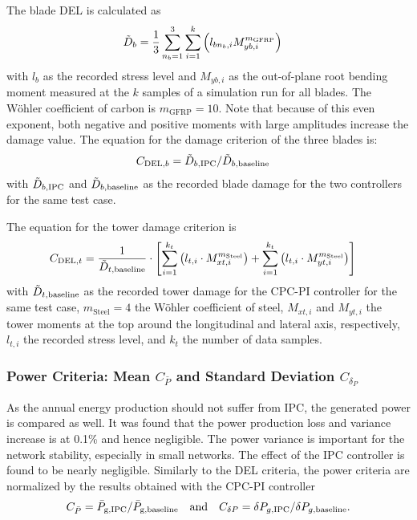 The blade DEL is calculated as
\begin{align*}
     \Tilde{D}_{b} &=   \frac{1}{3}  \sum_{n_b=1}^3\sum_{i=1}^{k}\left(l_{bn_b,i}  M_{yb,i}^{m_{\text{GFRP}}}\right)
\end{align*}
with $l_{b}$ as the recorded stress level and $M_{yb,i}$ as the out-of-plane root bending moment measured at the $k$ samples of a simulation run for all blades.  The Wöhler coefficient of carbon is $m_{\text{GFRP}} =10$. Note that because of this even exponent, both negative and positive moments with large amplitudes increase the damage value.
The equation for the damage criterion of the three blades is:
\begin{align*}
    C_{\text{DEL},b} &=  \Tilde{D}_{b,\text{IPC}}/\Tilde{D}_{b,\text{baseline}}  %
\end{align*}
%
with  $\Tilde{D}_{b,\text{IPC}}$ and $\Tilde{D}_{b,\text{baseline}}$ as the recorded blade damage for the two controllers for the same test case. 

The equation for the tower damage criterion is
\begin{align*}
    C_{\text{DEL},t} &= \frac{1}{\Tilde{D}_{t,\text{baseline}}} \cdot
    \left[ \sum_{i=1}^{k_{t}} \left( l_{t,i} \cdot M_{xt,i}^{m_{\text{Steel}}} \right) + 
    \sum_{i=1}^{k_{t}} \left( l_{t,i} \cdot M_{yt,i}^{m_{\text{Steel}}} \right) \right]
\end{align*}
with $\Tilde{D}_{t,\text{baseline}}$ as the recorded tower damage for the CPC-PI controller for the same test case, $m_{\text{Steel}} =4$ the Wöhler coefficient of steel, $M_{xt,i}$ and $M_{yt,i}$ the tower moments at the top around the longitudinal and lateral axis, respectively,  $l_{t,i}$ the recorded stress level, and $k_t$ the number of data samples.

\subsubsection*{Power Criteria: Mean $C_{\bar{P}}$ and Standard Deviation $C_{\delta_P}$}
As the annual energy production should not suffer from IPC, the generated power is compared as well. It was found that the power production loss and variance increase is at 0.1\% and hence negligible. The power variance is important for the network stability, especially in small networks. The effect of the IPC controller is found to be nearly negligible. Similarly to the DEL criteria, the power criteria are normalized by the results obtained with the CPC-PI controller
\begin{align*} %
    C_{\bar{P}} =  \bar{P}_{\text{g,\text{IPC}}}/ \bar{P}_{\text{g,\text{baseline}}}  \quad\text{and}\quad C_{\delta P} =  \delta P_{g,\text{IPC}}/ \delta P_{g,\text{baseline}}.
\end{align*} 

